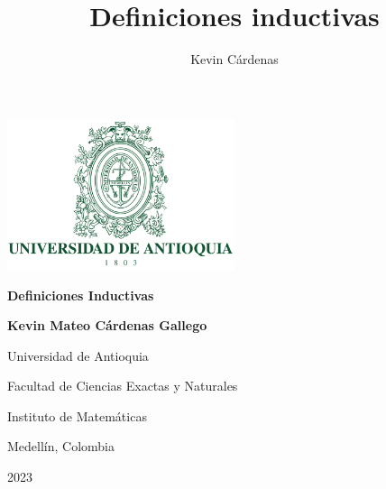\documentclass[11pt,oneside]{report}
\title{Definiciones inductivas}
\author{Kevin Cárdenas}
\theoremstyle{plain}
\theoremstyle{definition}
\begin{document}
\begin{titlepage}
    \centering
        \includegraphics[width=0.5\textwidth]{udea_portada.png}\par\vspace{1cm}
        {\Huge \textbf{Definiciones Inductivas}}\par\vspace{2cm}
        {\LARGE \textbf{Kevin Mateo Cárdenas Gallego}}

        \vfill
        {Universidad de Antioquia\par}
        \vspace{1mm}
        {Facultad de Ciencias Exactas y Naturales\par}
        \vspace{1mm}
        {Instituto de Matemáticas\par}
        \vspace{1mm}
        {Medellín, Colombia\par}
        \vspace{1mm}
        {2023\par}
\end{titlepage}
\newpage
\null
\thispagestyle{empty}
\newpage
\end{document}
